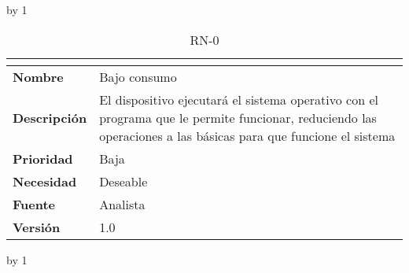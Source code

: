 \advance\rn by 1
\begin{table}[H]
	\caption{RN-0\number\rn}
	\begin{tabular}{|l|p{}|}
		\hline
		\multicolumn{2}{|c|}{\cellcolor[HTML]{BFBFBF}{\color[HTML]{000000} \textbf{RN-0\number\rn}}} \\ \hline
		\textbf{Nombre}      & Bajo consumo                                                                                                                                                  \\ \hline
		\textbf{Descripción} & El dispositivo ejecutará el sistema operativo con el programa que le permite funcionar, reduciendo las operaciones a las básicas para que funcione el sistema \\ \hline
		\textbf{Prioridad}   & Baja                                                                                                                                                          \\ \hline
		\textbf{Necesidad}   & Deseable                                                                                                                                                      \\ \hline
		\textbf{Fuente}      & Analista                                                                                                                                                      \\ \hline
		\textbf{Versión}     & 1.0                                                                                                                                                           \\ \hline
	\end{tabular}
\end{table}
\advance\rn by 1
